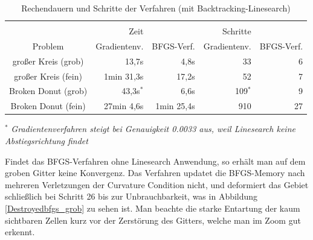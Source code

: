 \begin{table}[h]
\centering
\begin{tabular}{c rrrr}
\hline\\[-2.5ex]
 & \hspace{1cm} Zeit & & \hspace{1cm} Schritte \\
Problem &Gradientenv. &BFGS-Verf. &Gradientenv. &BFGS-Verf.  \\[0.2ex]

\hline \hline 
großer Kreis (grob) & 13,7s      & 4,8s       & 33      & 6 \\
großer Kreis (fein) & 1min 31,3s & 17,2s      & 52      & 7 \\
Broken Donut (grob) & 43,3s$^*$  & 6,6s       & 109$^*$ & 9 \\
Broken Donut (fein) & 27min 4,6s & 1min 25,4s & 910     & 27 \\
\hline
\end{tabular} 

\vspace{0.2cm}$^*$ \textit{Gradientenverfahren steigt bei Genauigkeit 0.0033 aus, weil \newline \hspace{-3.2cm}Linesearch keine Abstiegsrichtung findet}
 
\caption{Rechendauern und Schritte der Verfahren (mit Backtracking-Linesearch)}
\label{Tabelle}

\end{table}

Findet das BFGS-Verfahren ohne Linesearch Anwendung, so erhält man auf dem groben Gitter keine Konvergenz. Das Verfahren updatet die BFGS-Memory nach mehreren Verletzungen der Curvature Condition nicht, und deformiert das Gebiet schließlich bei Schritt 26 bis zur Unbrauchbarkeit, was in Abbildung \ref{Destroyedbfgs_grob} zu sehen ist. Man beachte die starke Entartung der kaum sichtbaren Zellen kurz vor der Zerstörung des Gitters, welche man im Zoom gut erkennt.


